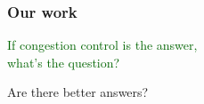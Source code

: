 \documentclass[svgnames]{beamer}
\newcommand{\ssline}{\vspace{8 pt}}
\begin{document}
\begin{frame}
{}
\end{frame}

%

\begin{frame}

\frametitle{Our work}

\begin{centering}

\LARGE \textcolor{DarkGreen}{If congestion control is the answer,\\what's the question?}

\vspace{\baselineskip}

\pause

\LARGE \textcolor{NavyBlue}{Are there better answers?}

\end{centering}

\end{frame}

%
%

%
%
%
%
%
%
%
\end{document}
